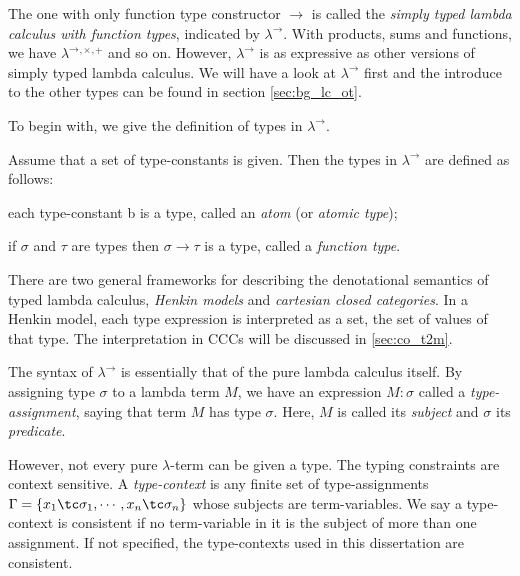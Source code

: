 The one with only function type constructor $ \to $ is called the \emph{simply typed lambda calculus with function types}, indicated by $ \lambda ^\to $. With products, sums and functions, we have $ \lambda ^\to{}^,{}^\times{}^,{}^+ $ and so on. However, $ \lambda ^\to $ is as expressive as other versions of simply typed lambda calculus. We will have a look at $ \lambda ^\to $ first and the introduce to the other types can be found in section \ref{sec:bg_lc_ot}.

To begin with, we give the definition of types in $ \lambda ^\to $.
\begin{definition}
\label{definition:types}
Assume that a set of type-constants is given. Then the types in $ \lambda ^\to $ are defined as follows:
\begin{myitemize}
\item each type-constant b is a type, called an \emph{atom} (or \emph{atomic type});
\item if $ \sigma $ and $ \tau $ are types then $ \sigma \to \tau $ is a type, called a \emph{function type}.
\end{myitemize}
\end{definition}

There are two general frameworks for describing the denotational semantics of typed lambda calculus, \emph{Henkin models} and \emph{cartesian closed categories}. In a Henkin model, each type expression is interpreted as a set, the set of values of that type. The interpretation in CCCs will be discussed in \ref{sec:co_t2m}.

The syntax of $ \lambda ^\to $ is essentially that of the pure lambda calculus itself. By assigning type $ \sigma $ to a lambda term $ M $, we have an expression $ M : \sigma $ called a \emph{type-assignment}, saying that term $ M $ has type $ \sigma $. Here, $ M $ is called its \emph{subject} and $ \sigma $ its \emph{predicate}.

However, not every pure $ \lambda $-term can be given a type. The typing constraints are context sensitive. A \emph{type-context} is any finite set of type-assignments $ \Gamma = \{ x_1 \tc \sigma _1 , \cdots , x_n \tc \sigma _n \} $ whose subjects are term-variables. We say a type-context is consistent if no term-variable in it is the subject of more than one assignment. If not specified, the type-contexts used in this dissertation are consistent.

